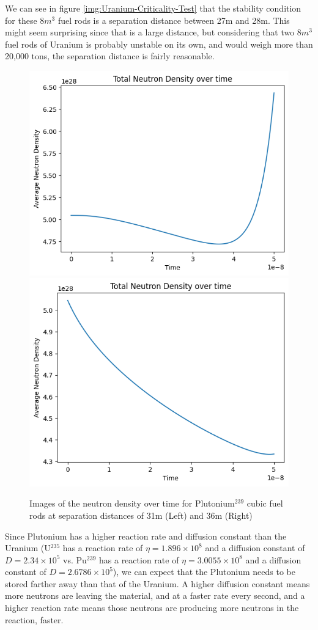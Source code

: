 \documentclass[letterpaper, 12pt]{article}
\begin{document}
         We can see in figure \ref{img:Uranium-Criticality-Test} that the stability condition for these $8m^3$ fuel rods is a separation distance between 27m and 28m. This might seem surprising since that is a large distance, but considering that two $8m^3$ fuel rods of Uranium is probably unstable on its own, and would weigh more than 20,000 tons, the separation distance is fairly reasonable.\\

         \begin{figure}[h!]
            \centering
            \includegraphics[width=0.45\linewidth]{Graphs/Criticality-Test-Pu-239-31m.png}
            \includegraphics[width=0.45\linewidth]{Graphs/Criticality-Test-Pu-239-36m.png}
            \caption{Images of the neutron density over time for Plutonium$^{239}$ cubic fuel rods at separation distances of 31m (Left) and 36m (Right)}
            \label{img:Plutonium-Criticality-Test}
         \end{figure}

         Since Plutonium has a higher reaction rate and diffusion constant than the Uranium (U$^{235}$ has a reaction rate of $\eta = 1.896 \times 10^8$ and a diffusion constant of $D = 2.34 \times 10^5$  vs. Pu$^{239}$ has a reaction rate of $\eta = 3.0055 \times 10^{8}$ and a diffusion constant of $D = 2.6786 \times 10^5$), we can expect that the Plutonium needs to be stored farther away than that of the Uranium. A higher diffusion constant means more neutrons are leaving the material, and at a faster rate every second, and a higher reaction rate means those neutrons are producing more neutrons in the reaction, faster.\\
\end{document}
